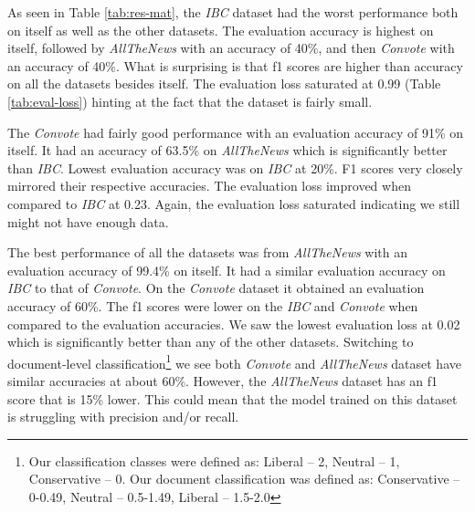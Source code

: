 \documentclass[10pt,a4paper,onecolumn]{article}
\begin{document}
As seen in Table \ref{tab:res-mat}, the \textit{IBC} dataset had the worst performance both on itself as well as the other datasets. The evaluation accuracy is highest on itself, followed by \textit{AllTheNews} with an accuracy of 40\%, and then \textit{Convote} with an accuracy of 40\%. What is surprising is that f1 scores are higher than accuracy on all the datasets besides itself. The evaluation loss saturated at 0.99 (Table \ref{tab:eval-loss}) hinting at the fact that the dataset is fairly small.

The \textit{Convote} had fairly good performance with an evaluation accuracy of 91\% on itself. It had an accuracy of 63.5\% on \textit{AllTheNews} which is significantly better than \textit{IBC}. Lowest evaluation accuracy was on \textit{IBC} at 20\%. F1 scores very closely mirrored their respective accuracies. The evaluation loss improved when compared to \textit{IBC} at 0.23. Again, the evaluation loss saturated indicating we still might not have enough data.

The best performance of all the datasets was from \textit{AllTheNews} with an evaluation accuracy of 99.4\% on itself. It had a similar evaluation accuracy on \textit{IBC} to that of \textit{Convote}. On the \textit{Convote} dataset it obtained an evaluation accuracy of 60\%. The f1 scores were lower on the \textit{IBC} and \textit{Convote} when compared to the evaluation accuracies. We saw the lowest evaluation loss at 0.02 which is significantly better than any of the other datasets. Switching to document-level classification\footnote{Our classification classes were defined as: Liberal -- 2, Neutral -- 1, Conservative -- 0. Our document classification was defined as: Conservative -- 0-0.49, Neutral -- 0.5-1.49, Liberal -- 1.5-2.0} we see both \textit{Convote} and \textit{AllTheNews} dataset have similar accuracies at about 60\%. However, the \textit{AllTheNews} dataset has an f1 score that is 15\% lower. This could mean that the model trained on this dataset is struggling with precision and/or recall.
\end{document}
